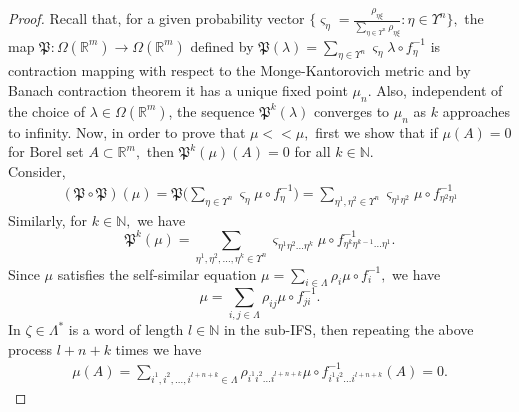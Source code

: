 \documentclass[10pt,a4paper]{amsart}
\begin{document}
\begin{proof}
    Recall that, for a given probability vector $\{\varsigma_{\eta}= \frac{\rho_{ \eta \xi}}{ \sum_{\eta \in \Upsilon^n} \rho_{\eta \xi}}: \eta \in \Upsilon^n\},$ the map $\mathfrak{P}: \Omega(\mathbb{R}^m) \to \Omega(\mathbb{R}^m)$ defined by $\mathfrak{P}(\lambda)= \sum_{\eta \in \Upsilon^n} \varsigma_{\eta} \lambda \circ f_{\eta}^{-1}$ is contraction mapping with respect to the Monge-Kantorovich metric and by Banach contraction theorem it has a unique fixed point $\mu_n$. Also, independent of the choice of $\lambda \in \Omega(\mathbb{R}^m)$, the sequence $\mathfrak{P}^k(\lambda)$ converges to $\mu_n$ as $k$ approaches to infinity. Now, in order to prove that $\mu << \mu,$ first we show that if $\mu(A)=0$ for Borel set $A \subset \mathbb{R}^m,$ then $\mathfrak{P}^k(\mu)(A)= 0$ for all $k \in \mathbb{N}.$\\
    Consider, 
\begin{equation}\label{eq24}
\begin{aligned}
(\mathfrak{P} \circ \mathfrak{P})(\mu) = \mathfrak{P}\bigg(\sum_{\eta \in \Upsilon^n} \varsigma_{\eta} \mu \circ f_{\eta}^{-1} \bigg) = \sum_{\eta^1, \eta^2 \in \Upsilon^n}\varsigma_{\eta^1 \eta^2} \mu \circ f_{\eta^2 \eta^1}^{-1} 
\end{aligned}
\end{equation}
    Similarly, for $k \in \mathbb{N},$ we have 
    \[  \mathfrak{P}^k(\mu)= \sum_{\eta^1,\eta^2,\ldots,\eta^k \in \Upsilon^n} \varsigma_{\eta^1\eta^2\ldots\eta^k} \mu \circ f_{\eta^k \eta^{k-1}\ldots \eta^1}^{-1}.\]
    Since $\mu$ satisfies the self-similar equation $\mu= \sum_{i \in \Lambda} \rho_i \mu \circ f_{i}^{-1},$ we have 
    \[\mu= \sum_{i,j \in \Lambda} \rho_{ij} \mu \circ f_{ji}^{-1}.\]
    In $\zeta \in \Lambda^*$ is a word of length $l \in \mathbb{N}$ in the sub-IFS, then repeating the above process $l+n+k$ times we have 
    \begin{equation}\label{eq25}
    \begin{aligned}
        \mu(A) = \sum_{i^1,i^2,\ldots,i^{l+n+k} \in \Lambda} \rho_{i^1i^2\ldots i^{l+n+k}} \mu \circ f_{i^1i^2\ldots i^{l+n+k}}^{-1}(A)=0.
         \end{aligned}
    \end{equation}
    \end{proof}  
\end{document}
